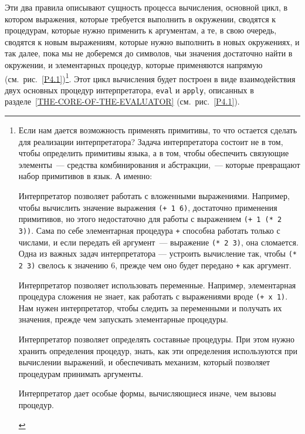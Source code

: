 Эти два правила описывают сущность процесса вычисления,
основной цикл, в котором выражения, которые требуется выполнить в
окружении, сводятся к процедурам, которые нужно применить к
аргументам, а те, в свою очередь,  сводятся к новым выражениям,
которые нужно выполнить в новых окружениях, и так далее, пока мы не
доберемся до символов, чьи значения достаточно найти в окружении,
и элементарных процедур, которые применяются напрямую 
(см.~рис.~\ref{P4.1})\footnote{Если нам 
дается возможность применять примитивы, то что
остается сделать для реализации интерпретатора?
Задача 
интерпретатора состоит не в том, чтобы определить примитивы языка, а в
том, чтобы обеспечить связующие элементы~--- средства комбинирования и
абстракции,~--- которые превращают набор примитивов в язык.  А
именно:

\begin{plainlist}
\item
Интерпретатор позволяет работать с вложенными
выражениями.  Например, чтобы вычислить значение выражения
{\tt (+ 1 6)}, достаточно применения примитивов, но этого
недостаточно для работы с выражением {\tt (+ 1 (* 2 3))}.  Сама
по себе элементарная процедура {\tt +} способна работать только
с числами, и если передать ей аргумент~--- выражение {\tt (* 2
3)}, она сломается.  Одна из важных задач интерпретатора
--- устроить вычисление так, чтобы
{\tt (* 2 3)} свелось к значению 6, прежде чем оно будет
передано {\tt +} как аргумент.

\item
Интерпретатор позволяет использовать
переменные.  Например, элементарная процедура сложения не знает, как
работать с выражениями вроде {\tt (+ x 1)}.  Нам нужен
интерпретатор, чтобы следить за переменными и получать их значения,
прежде чем запускать элементарные процедуры.

\item
Интерпретатор позволяет определять составные
процедуры.  При этом нужно хранить определения процедур, знать, как
эти определения используются при вычислении выражений, и обеспечивать
механизм, который позволяет процедурам принимать аргументы.

\item
Интерпретатор дает особые формы, вычисляющиеся
иначе, чем вызовы процедур.
\end{plainlist}%
}.
Этот цикл вычисления будет построен в виде взаимодействия двух
основных процедур интерпретатора, {\tt eval} и
{\tt apply}, описанных в 
разделе~\ref{THE-CORE-OF-THE-EVALUATOR}
(см.~рис.~\ref{P4.1}).

